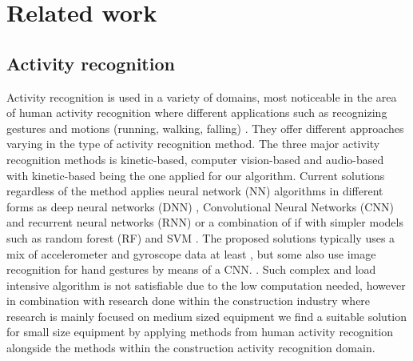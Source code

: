 \section{Related work}
\subsection{Activity recognition}
Activity recognition is used in a variety of domains, most noticeable in the area of human activity recognition where different applications such as recognizing gestures and motions (running, walking, falling) . 
They offer different approaches varying in the type of activity recognition method. 
The three major activity recognition methods is kinetic-based, computer vision-based and audio-based  \cite{soaWorkersAndEquipment} with kinetic-based being the one applied for our algorithm. 
Current solutions regardless of the method applies neural network (NN)  algorithms in different forms as deep neural networks (DNN) , Convolutional Neural Networks (CNN)  and recurrent neural networks (RNN)  or a combination of if with simpler models such as random forest (RF)  and SVM \cite{hybridHARSVMCNN}. 
The proposed solutions typically uses a mix of accelerometer and gyroscope data at least , but some also use image recognition for hand gestures by means of a CNN. . 
Such complex and load intensive algorithm  is not satisfiable due to the low computation needed, however in combination with research done within the construction  industry \cite{soaWorkersAndEquipment} where research is mainly focused on medium sized equipment  we find  a suitable solution  for small size equipment by applying methods from human activity recognition alongside the methods within the construction activity recognition domain.

